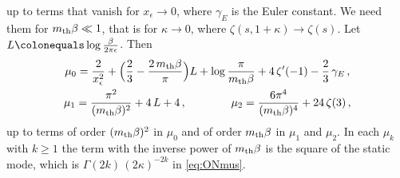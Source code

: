 \documentclass[a4paper,11pt]{article}
\begin{document}
up to terms that vanish for $x_\epsilon\to0$, where $\gamma_E$ is the Euler constant.	 We need them for $m_{\rm th}\beta\ll1$, that is for $\kappa\to0$, where $\zeta(s,1+\kappa)\to\zeta(s)$. Let $L\colonequals\log\tfrac{\beta}{2\pi\epsilon}$. Then
\begin{equation}\label{eq:ONmusmall}
	\begin{gathered}
		\mu_0=\frac{2}{x_\epsilon^2}+\Bigl(\frac23-\frac{2\,m_{\rm th}\beta}{\pi}\Bigr)L+\log\frac{\pi}{m_{\rm th}\beta}+4\,\zeta'(-1)-\frac23\,\gamma_E\, ,\\
		\mu_1=\frac{\pi^2}{(m_{\rm th}\beta)^2}+4\,L+4\, ,\qquad\qquad
		\mu_2=\frac{6\pi^4}{(m_{\rm th}\beta)^4}+24\,\zeta(3)\, ,
	\end{gathered}
\end{equation}
up to terms of order $(m_{\rm th}\beta)^2$ in $\mu_0$ and of order $m_{\rm th}\beta$ in $\mu_1$ and $\mu_2$. In each $\mu_k$ with $k\ge1$ the term with the inverse power of $m_{\rm th}\beta$ is the square of the static mode, which is $\Gamma(2k)\,(2\kappa)^{-2k}$ in \eqref{eq:ONmus}.
\end{document}
